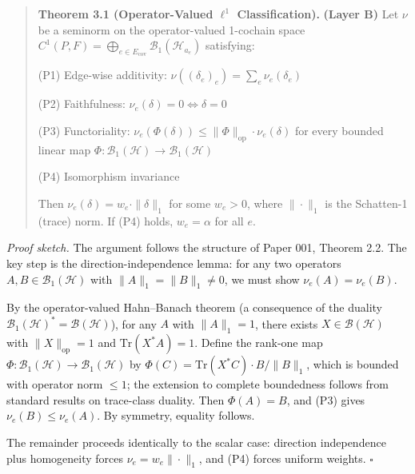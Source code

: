 \documentclass[
]{article}
\begin{document}
\begin{quote}
\textbf{Theorem 3.1 (Operator-Valued \(\ell^1\) Classification).}
\textbf{(Layer B)} Let \(\nu\) be a seminorm on the operator-valued
1-cochain space
\(C^1(P, F) = \bigoplus_{e \in E_{\mathrm{cov}}} \mathcal{B}_1(\mathcal{H}_{a_e})\)
satisfying:

(P1) Edge-wise additivity:
\(\nu((\delta_e)_e) = \sum_e \nu_e(\delta_e)\)

(P2) Faithfulness: \(\nu_e(\delta) = 0 \iff \delta = 0\)

(P3) Functoriality:
\(\nu_e(\Phi(\delta)) \leq \|\Phi\|_{\mathrm{op}} \cdot \nu_e(\delta)\)
for every bounded linear map
\(\Phi: \mathcal{B}_1(\mathcal{H}) \to \mathcal{B}_1(\mathcal{H})\)

(P4) Isomorphism invariance

Then \(\nu_e(\delta) = w_e \cdot \|\delta\|_1\) for some \(w_e > 0\),
where \(\|\cdot\|_1\) is the Schatten-1 (trace) norm. If (P4) holds,
\(w_e = \alpha\) for all \(e\).
\end{quote}

\emph{Proof sketch.} The argument follows the structure of Paper 001,
Theorem 2.2. The key step is the direction-independence lemma: for any
two operators \(A, B \in \mathcal{B}_1(\mathcal{H})\) with
\(\|A\|_1 = \|B\|_1 \neq 0\), we must show \(\nu_e(A) = \nu_e(B)\).

By the operator-valued Hahn--Banach theorem (a consequence of the
duality \(\mathcal{B}_1(\mathcal{H})^* = \mathcal{B}(\mathcal{H})\)),
for any \(A\) with \(\|A\|_1 = 1\), there exists
\(X \in \mathcal{B}(\mathcal{H})\) with \(\|X\|_{\mathrm{op}} = 1\) and
\(\mathrm{Tr}(X^* A) = 1\). Define the rank-one map
\(\Phi: \mathcal{B}_1(\mathcal{H}) \to \mathcal{B}_1(\mathcal{H})\) by
\(\Phi(C) = \mathrm{Tr}(X^* C) \cdot B / \|B\|_1\), which is bounded
with operator norm \(\leq 1\); the extension to complete boundedness
follows from standard results on trace-class duality. Then
\(\Phi(A) = B\), and (P3) gives \(\nu_e(B) \leq \nu_e(A)\). By symmetry,
equality follows.

The remainder proceeds identically to the scalar case: direction
independence plus homogeneity forces \(\nu_e = w_e \|\cdot\|_1\), and
(P4) forces uniform weights. \(\square\)
\end{document}
